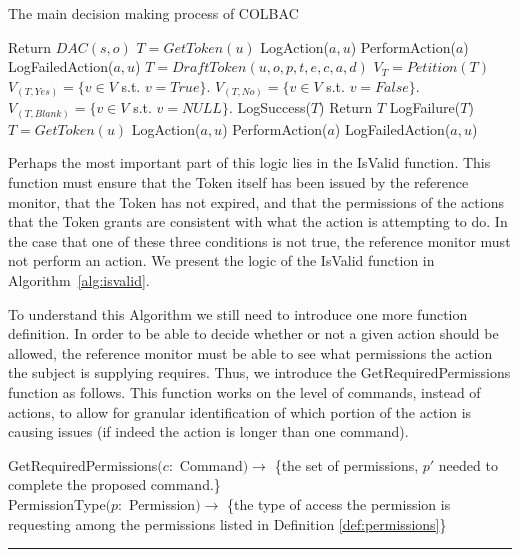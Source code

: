 \begin{algorithm}
\caption{The main decision making process of COLBAC}
\label{alg:main}
\begin{algorithmic}[1]
    \State Return $DAC(s,o)$
    \State $T = GetToken(u)$
            \State LogAction($a, u$)
            \State PerformAction($a$)
        \Else
            \State LogFailedAction($a, u$)
        \EndIf
    \Else
        \State $T = DraftToken(u,o,p,t,e,c,a,d)$
            \State $V_{T} = Petition(T)$
            \State $V_{(T, Yes)} = \{v \in V$ s.t. $v = True\}.$
            \State $V_{(T, No)} = \{v \in V$ s.t. $v = False\}.$
            \State $V_{(T, Blank)} = \{v \in V$ s.t. $v = NULL\}$.
                \State LogSuccess($T$)
                \State Return $T$
            \Else
                \State LogFailure($T$)
            \EndIf
        \EndIf
    \EndIf
\Else
    \State $T = GetToken(u)$
        \State LogAction($a, u$)
        \State PerformAction($a$)
    \Else
        \State LogFailedAction($a, u$)
    \EndIf
\EndIf
\end{algorithmic}
\end{algorithm}

Perhaps the most important part of this logic lies in the IsValid function. This
function must ensure that the Token itself has been issued by the reference
monitor, that the Token has not expired, and that the permissions of the actions
that the Token grants are consistent with what the action is attempting to do.
In the case that one of these three conditions is not true, the reference
monitor must not perform an action. We present the logic of the IsValid function
in Algorithm~\ref{alg:isvalid}.

To understand this Algorithm we still need to introduce one more function
definition. In order to be able to decide whether or not a given action should
be allowed, the reference monitor must be able to see what permissions the
action the subject is supplying requires. Thus, we introduce the
GetRequiredPermissions function as follows. This function works on the level of
commands, instead of actions, to allow for granular identification of which
portion of the action is causing issues (if indeed the action is longer than one
command).

\begin{definition}
GetRequiredPermissions$(c:$ Command$) \rightarrow$ \{the set of permissions,
$p'$ needed to complete the proposed command.\}\\
PermissionType$(p:$ Permission$) \rightarrow $ \{the type of access the
permission is requesting among the permissions listed in Definition
\ref{def:permissions}\}\\
\hrule\mbox{}\\
\end{definition}

